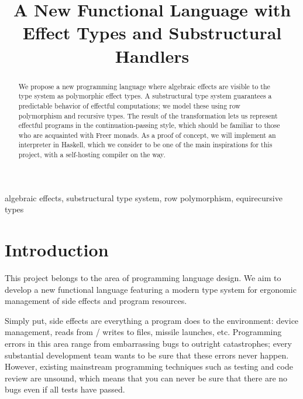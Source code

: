 \documentclass[conference]{IEEEtran}
\begin{document}
\title{A New Functional Language with Effect Types and Substructural Handlers}

\author{
}

\maketitle

\begin{abstract}
We propose a new programming language where algebraic effects are visible to the
type system as polymorphic effect types. A substructural type system guarantees
a predictable behavior of effectful computations; we model these using row
polymorphism and recursive types. The result of the transformation lets us
represent effectful programs in the continuation-passing style, which should be
familiar to those who are acquainted with Freer monads. As a proof of concept,
we will implement an interpreter in Haskell, which we consider to be one of the
main inspirations for this project, with a self-hosting compiler on the way.
\end{abstract}

\begin{IEEEkeywords}
algebraic effects, substructural type system, row polymorphism,
equirecursive types
\end{IEEEkeywords}

\section{Introduction}

This project belongs to the area of programming language design. We aim to
develop a new functional language featuring a modern type system for ergonomic
management of side effects and program resources.

Simply put, side effects are everything a program does to the environment:
device management, reads from / writes to files, missile launches, etc.
Programming errors in this area range from embarrassing bugs to outright
catastrophes; every substantial development team wants to be sure that these
errors never happen. However, existing mainstream programming techniques such as
testing and code review are unsound, which means that you can never be sure that
there are no bugs even if all tests have passed.
\end{document}
